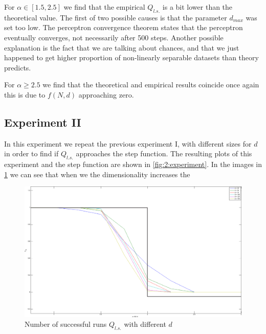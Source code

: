 For $\alpha \in [1.5, 2.5]$ we find that the empirical $Q_{l.s.}$ is a bit lower than the theoretical value. The first of two possible causes is that the parameter $d_{max}$ was set too low. The perceptron convergence theorem states that the perceptron eventually converges, not necessarily after 500 steps. Another possible explanation is the fact that we are talking about chances, and that we just happened to get higher proportion of non-linearly separable datasets than theory predicts. 

For $\alpha \geq 2.5$ we find that the theoretical and empirical results coincide once again this is due to $f(N,d)$ approaching zero.

\subsection*{Experiment II}

In this experiment we repeat the previous experiment I, with different sizes for $d$ in order to find if $Q_{l.s.}$ approaches the step function. The resulting plots of this experiment and the step function are shown in \vref{fig:2:experiment}. In the images in \cref{fig:2:experiment} we can see that when we the dimensionality increases the 

\begin{figure}
	\centering
	\includegraphics[width=\textwidth]{./img/assignmentb}
	\caption{Number of successful runs $Q_{l.s.}$ with different $d$}
	\label{fig:2:experiment}
\end{figure}


